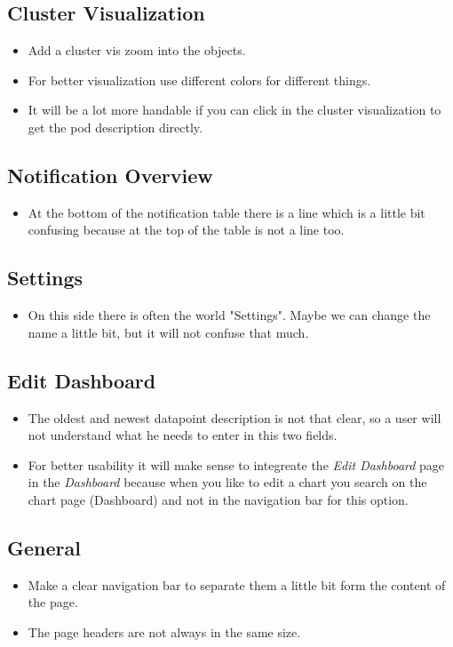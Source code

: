 \subsection{Cluster Visualization}
\begin{itemize}
    \item Add a cluster vis zoom into the objects.
    \item For better visualization use different colors for different things.
    \item It will be a lot more handable if you can click in the cluster visualization to get the pod description directly.
\end{itemize}

\subsection{Notification Overview}
\begin{itemize}
    \item At the bottom of the notification table there is a line which is a little bit confusing because at the top of the table is not a line too.
\end{itemize}

\subsection{Settings}
\begin{itemize}
    \item On this side there is often the world "Settings". Maybe we can change the name a little bit, but it will not confuse that much.
\end{itemize}

\subsection{Edit Dashboard}
\begin{itemize}
    \item The oldest and newest datapoint description is not that clear, so a user will not understand what he needs to enter in this two fields.
    \item For better usability it will make sense to integreate the \textit{Edit Dashboard} page in the \textit{Dashboard} because when you like to edit a chart you search on the chart page (Dashboard) and not in the navigation bar for this option.
\end{itemize}

\subsection{General}
\begin{itemize}
    \item Make a clear navigation bar to separate them a little bit form the content of the page.
    \item The page headers are not always in the same size.
\end{itemize}